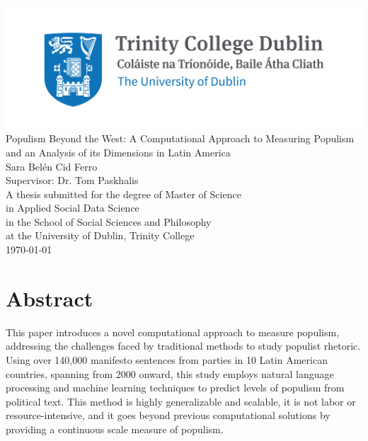 \documentclass[12pt,letterpaper]{article}
\begin{document}
	

	\begin{titlepage}
		\centering
		\vspace*{1cm} %
		
		\includegraphics[width=\textwidth]{Trinity_RGB_transparent_main.png}\\[1cm]
		
		{\LARGE Populism Beyond the West: A Computational Approach to Measuring Populism and an Analysis of its Dimensions in Latin America}\\[1cm]
		{\large Sara Belén Cid Ferro}\\[0.3cm]
		
		\large Supervisor: Dr. Tom Paskhalis\\[1cm]
		
		{\normalsize A thesis submitted for the degree of Master of Science}\\
		{\normalsize in Applied Social Data Science}\\
		{\normalsize in the School of Social Sciences and Philosophy}\\
		{\normalsize at the University of Dublin, Trinity College}\\[1cm]
		
		{\large \today}
	\end{titlepage}

\section*{Abstract}

\vspace{.25cm}
\noindent This paper introduces a novel computational approach to measure populism, addressing the challenges faced by traditional methods to study populist rhetoric. Using over 140,000 manifesto sentences from parties in 10 Latin American countries, spanning from 2000 onward, this study employs natural language processing and machine learning techniques to predict levels of populism from political text. This method is highly generalizable and scalable, it is not labor or resource-intensive, and it goes beyond previous computational solutions by providing a continuous scale measure of populism. 
\end{document}
